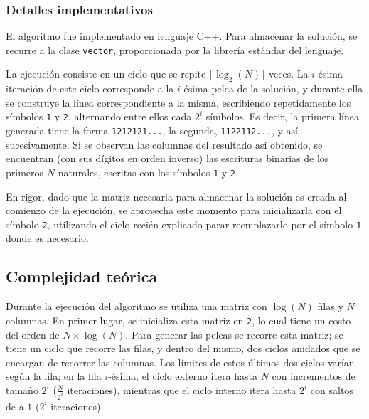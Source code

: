         \subsubsection{Detalles implementativos}
            El algoritmo fue implementado en lenguaje C++. Para almacenar la solución, se recurre a la clase \texttt{vector}, proporcionada por la librería estándar del lenguaje.

            La ejecución consiste en un ciclo que se repite $\lceil \log_2(N) \rceil$ veces. La $i$-ésima iteración de este ciclo corresponde a la $i$-ésima pelea de la solución, y durante ella se construye la línea correspondiente a la misma, escribiendo repetidamente los símbolos \texttt{1} y \texttt{2}, alternando entre ellos cada $2^i$ símbolos. Es decir, la primera línea generada tiene la forma \texttt{1212121...}, la segunda, \texttt{1122112...}, y así sucesivamente. Si se observan las columnas del resultado así obtenido, se encuentran (con sus dígitos en orden inverso) las escrituras binarias de los primeros $N$ naturales, escritas con los símbolos \texttt{1} y \texttt{2}.

            En rigor, dado que la matriz necesaria para almacenar la solución es creada al comienzo de la ejecución, se aprovecha este momento para inicializarla con el símbolo \texttt{2}, utilizando el ciclo recién explicado parar reemplazarlo por el símbolo \texttt{1} donde es necesario.


    \subsection{Complejidad teórica}
         
      Durante la ejecución del algoritmo se utiliza una matriz con $\log(N)$ filas y $N$ columnas. En primer lugar, se inicializa esta matriz en \texttt{2}, lo cual tiene un costo del orden de $N \times \log(N)$. Para generar las peleas se recorre esta matriz; se tiene un ciclo que recorre las filas, y dentro del mismo, dos ciclos anidados que se encargan de recorrer las columnas. Los límites de estos últimos dos ciclos varían según la fila; en la fila $i$-ésima, el ciclo externo itera hasta $N$ con incrementos de tamaño $2^i$ ($\frac{N}{2^i}$ iteraciones), mientras que el ciclo interno itera hasta $2^i$ con saltos de a $1$ ($2^i$ iteraciones).

